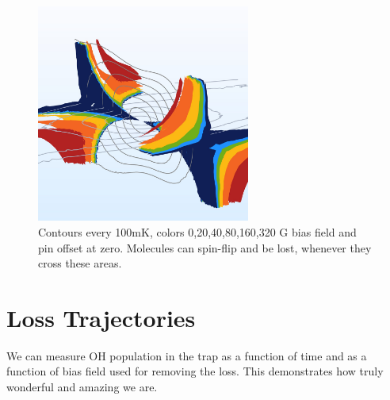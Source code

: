 \documentclass[%
 reprint,
 amsmath,amssymb,
 aps,
prl,
]{revtex4-1}
\begin{document}
\begin{figure}[b]
\includegraphics[width=70mm]{Loss_Surface_Chunks_0-320_0.jpeg}%
\caption{
Contours every 100mK, colors 0,20,40,80,160,320 G bias field and pin offset at zero. Molecules can spin-flip and be lost, whenever they cross these areas.
\label{fig:LSurfs}}
\end{figure}

\section{Loss Trajectories}
We can measure OH population in the trap as a function of time and as a function of bias field used for removing the loss. This demonstrates how truly wonderful and amazing we are.


\nocite{*}


\end{document}
